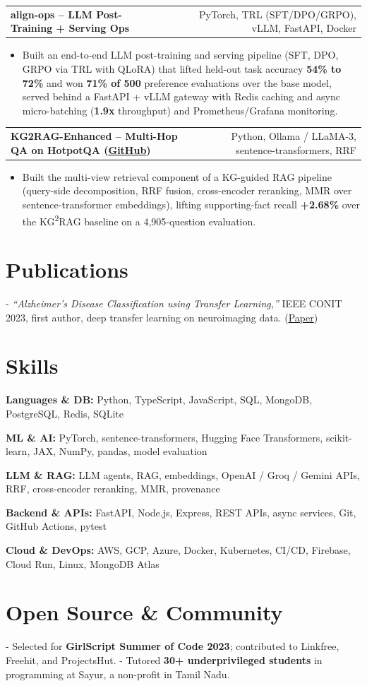 \documentclass[letterpaper,11pt]{article}
\makeatletter
\newcommand{\projItem}[2]{%
  \vspace{2pt}
  \begin{tabular*}{\textwidth}{@{}l@{\extracolsep{\fill}}r@{}}
    \textbf{#1} & #2 \\
  \end{tabular*}\par\vspace{-3pt}
}
\newcommand{\skillLine}[2]{\textbf{#1:} #2\par\vspace{1.5pt}}
\newcommand{\inlineBlock}[1]{{\setlength{\leftskip}{0.18in}\small #1\par}}
\makeatother
\begin{document}
\projItem{align-ops -- LLM Post-Training + Serving Ops}{PyTorch, TRL (SFT/DPO/GRPO), vLLM, FastAPI, Docker}
\begin{itemize}
  \item Built an end-to-end LLM post-training and serving pipeline (SFT, DPO, GRPO via TRL with QLoRA) that lifted held-out task accuracy \textbf{54\% to 72\%} and won \textbf{71\% of 500} preference evaluations over the base model, served behind a FastAPI + vLLM gateway with Redis caching and async micro-batching (\textbf{1.9x} throughput) and Prometheus/Grafana monitoring.
\end{itemize}

\projItem{KG2RAG-Enhanced -- Multi-Hop QA on HotpotQA {\normalfont\small(\href{https://github.com/Deva-1903/KG2RAG-685-NLP}{GitHub})}}{Python, Ollama / LLaMA-3, sentence-transformers, RRF}
\begin{itemize}
  \item Built the multi-view retrieval component of a KG-guided RAG pipeline (query-side decomposition, RRF fusion, cross-encoder reranking, MMR over sentence-transformer embeddings), lifting supporting-fact recall \textbf{+2.68\%} over the KG\textsuperscript{2}RAG baseline on a 4{,}905-question evaluation.
\end{itemize}

\section{Publications}
\vspace{2pt}
\inlineBlock{- \textit{``Alzheimer's Disease Classification using Transfer Learning,''} IEEE CONIT 2023, first author, deep transfer learning on neuroimaging data. {\normalfont\small(\href{https://ieeexplore.ieee.org/document/10205760}{Paper})}}

\section{Skills}
\skillLine{Languages \& DB}{Python, TypeScript, JavaScript, SQL, MongoDB, PostgreSQL, Redis, SQLite}
\skillLine{ML \& AI}{PyTorch, sentence-transformers, Hugging Face Transformers, scikit-learn, JAX, NumPy, pandas, model evaluation}
\skillLine{LLM \& RAG}{LLM agents, RAG, embeddings, OpenAI / Groq / Gemini APIs, RRF, cross-encoder reranking, MMR, provenance}
\skillLine{Backend \& APIs}{FastAPI, Node.js, Express, REST APIs, async services, Git, GitHub Actions, pytest}
\skillLine{Cloud \& DevOps}{AWS, GCP, Azure, Docker, Kubernetes, CI/CD, Firebase, Cloud Run, Linux, MongoDB Atlas}

\section{Open Source \& Community}
\inlineBlock{- Selected for \textbf{GirlScript Summer of Code 2023}; contributed to Linkfree, Freehit, and ProjectsHut. - Tutored \textbf{30+ underprivileged students} in programming at Sayur, a non-profit in Tamil Nadu.}
\end{document}
